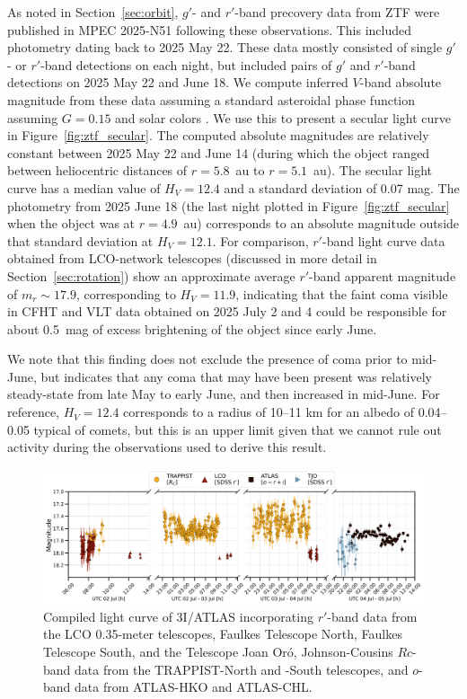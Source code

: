 \documentclass[linenumbers,twocolumn,longbib]{aastex7}
\begin{document}
As noted in Section~\ref{sec:orbit},  $g'$- and $r'$-band precovery data from ZTF were published in MPEC 2025-N51 following these observations. This included photometry dating back to 2025 May 22. These data mostly consisted of single $g'$- or $r'$-band detections on each night, but included pairs of $g'$ and $r'$-band detections on 2025 May 22 and June 18. We compute inferred $V$-band absolute magnitude from these data  assuming a standard asteroidal phase function \citep{bowell1989_astphotmodels_ast2} assuming $G=0.15$ and solar colors \citep{jordi2006_filtertransformations,holmberg2006_solarcolors}. We use this to present a secular light curve  in Figure~\ref{fig:ztf_secular}. The computed absolute magnitudes are relatively constant between 2025 May 22 and June 14 (during which the object ranged between heliocentric distances of $r=5.8$~au to $r=5.1$~au). The secular light curve has a median value of $H_V=12.4$ and a standard deviation of 0.07 mag. The photometry from 2025 June 18 (the last night plotted in Figure~\ref{fig:ztf_secular} when the object was at $r=4.9$~au) corresponds to an absolute magnitude outside that standard deviation at $H_V=12.1$.  For comparison, $r'$-band light curve data obtained from LCO-network telescopes (discussed in more detail in Section~\ref{sec:rotation}) show an approximate average $r'$-band apparent magnitude of $m_r\sim17.9$, corresponding to $H_V=11.9$, indicating that the faint coma visible in CFHT and VLT data obtained on 2025 July 2 and 4 could be responsible for about 0.5~mag of excess brightening of the object since early June.

We note that this finding does not exclude the presence of coma prior to mid-June, but indicates that any coma that may have been present was relatively steady-state from late May to early June, and then increased in mid-June. For reference, $H_V=12.4$ corresponds to a radius of 10--11 km for an albedo of 0.04--0.05 typical of comets, but this is an upper limit given that we cannot rule out activity during the observations used to derive this result.

\begin{figure}
\includegraphics[width=1.\linewidth]{figures/lightcurve_interstellar.png}
\caption{Compiled light curve of 3I/ATLAS incorporating $r'$-band data from the LCO 0.35-meter telescopes, Faulkes Telescope North, Faulkes Telescope South, and the Telescope Joan Or\'{o}, Johnson-Cousins $Rc$-band data from the TRAPPIST-North and -South telescopes, and $o$-band data from ATLAS-HKO and ATLAS-CHL.}
\label{fig:lc}
\end{figure}
\end{document}
